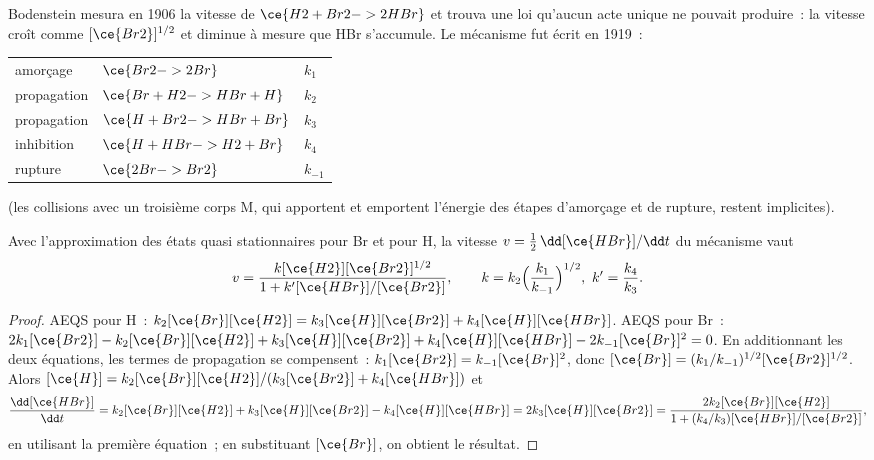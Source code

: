 Bodenstein mesura en 1906 la vitesse de $\ce{H2 + Br2 -> 2 HBr}$ et
trouva une loi qu'aucun acte unique ne pouvait produire~: la vitesse
croît comme $[\ce{Br2}]^{1/2}$ et diminue à mesure que HBr
s'accumule. Le mécanisme fut écrit en 1919~:
\begin{center}
\begin{tabular}{lll}
amorçage & $\ce{Br2 -> 2 Br}$ & $k_1$ \\
propagation & $\ce{Br + H2 -> HBr + H}$ & $k_2$ \\
propagation & $\ce{H + Br2 -> HBr + Br}$ & $k_3$ \\
inhibition & $\ce{H + HBr -> H2 + Br}$ & $k_4$ \\
rupture & $\ce{2 Br -> Br2}$ & $k_{-1}$
\end{tabular}
\end{center}
(les collisions avec un troisième corps M, qui apportent et emportent
l'énergie des étapes d'amorçage et de rupture, restent implicites).

\begin{theorem}\label{thm:b3:complex-kinetics:hbr}
Avec l'approximation des états quasi stationnaires pour Br et pour H,
la vitesse $v = \frac12\,\dd[\ce{HBr}]/\dd t$
du mécanisme vaut
\[
  v = \frac{k[\ce{H2}][\ce{Br2}]^{1/2}}{1 + k'[\ce{HBr}]/[\ce{Br2}]},
  \qquad k = k_2\Bigl(\frac{k_1}{k_{-1}}\Bigr)^{1/2},\ k' = \frac{k_4}{k_3}.
\]
\end{theorem}

\begin{proof}
AEQS pour H~: $k_2[\ce{Br}][\ce{H2}] = k_3[\ce{H}][\ce{Br2}] + k_4[\ce{H}][\ce{HBr}]$. AEQS pour Br~:
$2k_1[\ce{Br2}] - k_2[\ce{Br}][\ce{H2}] + k_3[\ce{H}][\ce{Br2}] + k_4[\ce{H}][\ce{HBr}] - 2k_{-1}[\ce{Br}]^2 = 0$.
En additionnant les deux
équations, les termes de propagation se compensent~: $k_1[\ce{Br2}] = k_{-1}[\ce{Br}]^2$, donc $[\ce{Br}] =
(k_1/k_{-1})^{1/2}[\ce{Br2}]^{1/2}$. Alors $[\ce{H}] = k_2[\ce{Br}][\ce{H2}]/(k_3[\ce{Br2}] + k_4[\ce{HBr}])$ et
\[
  \frac{\dd[\ce{HBr}]}{\dd t} = k_2[\ce{Br}][\ce{H2}] + k_3[\ce{H}][\ce{Br2}] - k_4[\ce{H}][\ce{HBr}] = 2k_3[\ce{H}][\ce{Br2}]
  = \frac{2k_2[\ce{Br}][\ce{H2}]}{1 + (k_4/k_3)[\ce{HBr}]/[\ce{Br2}]},
\]
en utilisant la première équation~; en substituant $[\ce{Br}]$, on obtient le résultat.
\end{proof}

